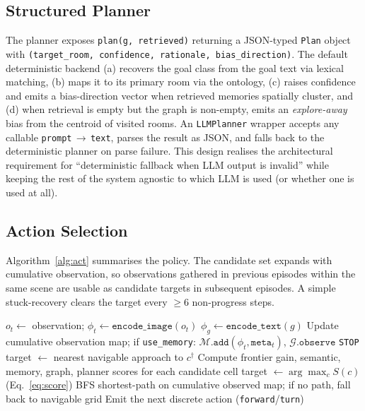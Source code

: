 \documentclass[conference,a4paper,10pt]{IEEEtran}
\begin{document}
\subsection{Structured Planner}

The planner exposes \texttt{plan(g, retrieved)} returning a JSON-typed
\texttt{Plan} object with \texttt{(target\_room, confidence, rationale,
bias\_direction)}. The default deterministic backend (a) recovers the
goal class from the goal text via lexical matching, (b) maps it to its
primary room via the ontology, (c) raises confidence and emits a
bias-direction vector when retrieved memories spatially cluster, and
(d) when retrieval is empty but the graph is non-empty, emits an
\emph{explore-away} bias from the centroid of visited rooms. An
\texttt{LLMPlanner} wrapper accepts any callable
\texttt{prompt}\,$\to$\,\texttt{text}, parses the result as JSON, and
falls back to the deterministic planner on parse failure. This design
realises the architectural requirement for ``deterministic fallback
when LLM output is invalid'' while keeping the rest of the system
agnostic to which LLM is used (or whether one is used at all).

\subsection{Action Selection}

Algorithm~\ref{alg:act} summarises the policy. The candidate set
expands with cumulative observation, so observations gathered in
previous episodes within the same scene are usable as candidate
targets in subsequent episodes. A simple stuck-recovery clears the
target every $\geq$6 non-progress steps.

\begin{algorithm}[t]
\caption{NEM-Nav action selection.}
\label{alg:act}
\begin{algorithmic}[1]
\State $o_t \gets$ observation; $\phi_t \gets \texttt{encode\_image}(o_t)$
\State $\phi_g \gets \texttt{encode\_text}(g)$
\State Update cumulative observation map; if \texttt{use\_memory}: $\mathcal{M}.\texttt{add}(\phi_t, \texttt{meta}_t)$, $\mathcal{G}.\texttt{observe}$
  \State \Return \texttt{STOP}
\EndIf
{}
  \State target $\gets$ nearest navigable approach to $c^\dag$
\Else
  \State Compute frontier gain, semantic, memory, graph, planner scores for each candidate cell
  \State target $\gets \arg\max_c S(c)$ \quad (Eq.~\ref{eq:score})
\EndIf
\State BFS shortest-path on cumulative observed map; if no path, fall back to navigable grid
\State Emit the next discrete action (\texttt{forward}/\texttt{turn})
\end{algorithmic}
\end{algorithm}
\end{document}

